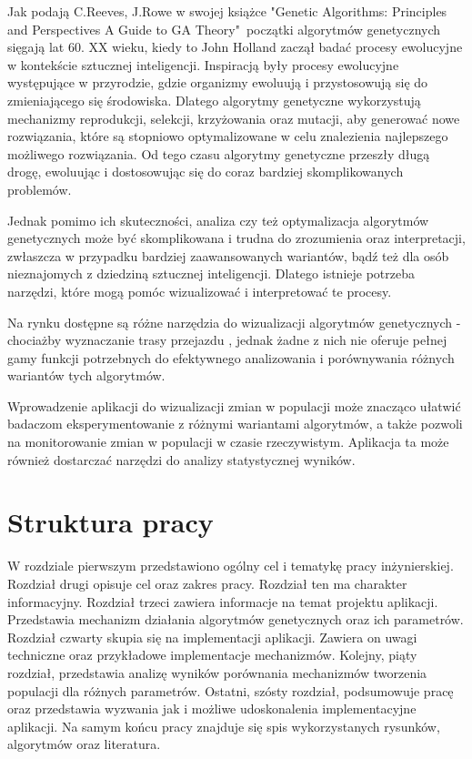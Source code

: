 Jak podają C.Reeves, J.Rowe w swojej książce "Genetic Algorithms: Principles and Perspectives
A Guide to GA Theory"\  początki algorytmów genetycznych sięgają lat 60. XX wieku, kiedy to John Holland zaczął badać procesy ewolucyjne w kontekście sztucznej inteligencji. 
Inspiracją były procesy ewolucyjne występujące w przyrodzie, gdzie organizmy ewoluują i przystosowują się do zmieniającego się środowiska. Dlatego algorytmy genetyczne wykorzystują mechanizmy reprodukcji, selekcji, krzyżowania oraz mutacji, aby generować nowe rozwiązania, które są stopniowo optymalizowane w celu znalezienia najlepszego możliwego rozwiązania.\linebreak
Od tego czasu algorytmy genetyczne przeszły długą drogę, ewoluując i dostosowując się do coraz bardziej skomplikowanych problemów.

Jednak pomimo ich skuteczności, analiza czy też optymalizacja algorytmów genetycznych może być skomplikowana i trudna do zrozumienia oraz interpretacji, zwłaszcza w przypadku bardziej zaawansowanych wariantów, bądź też dla osób nieznajomych z dziedziną sztucznej inteligencji. Dlatego istnieje potrzeba narzędzi, które mogą pomóc wizualizować i interpretować te procesy.

Na rynku dostępne są różne narzędzia do wizualizacji algorytmów genetycznych - chociażby wyznaczanie trasy przejazdu , jednak żadne z nich nie oferuje pełnej gamy funkcji potrzebnych do efektywnego analizowania i porównywania różnych wariantów tych algorytmów.

Wprowadzenie aplikacji do wizualizacji zmian w populacji może znacząco ułatwić badaczom eksperymentowanie z różnymi wariantami algorytmów, a także pozwoli na monitorowanie zmian w populacji w czasie rzeczywistym. Aplikacja ta może również dostarczać narzędzi do analizy statystycznej wyników.\\


\section{Struktura pracy}
W rozdziale pierwszym przedstawiono ogólny cel i tematykę pracy inżynierskiej. Rozdział drugi opisuje cel oraz zakres pracy. Rozdział ten ma charakter informacyjny. Rozdział trzeci zawiera informacje na temat projektu aplikacji. Przedstawia mechanizm działania algorytmów genetycznych oraz ich parametrów. Rozdział czwarty skupia się na implementacji aplikacji. Zawiera on uwagi techniczne oraz przykładowe implementacje mechanizmów. Kolejny, piąty rozdział, przedstawia analizę wyników porównania mechanizmów tworzenia populacji dla różnych parametrów. Ostatni, szósty rozdział, podsumowuje pracę oraz przedstawia wyzwania jak i możliwe udoskonalenia implementacyjne aplikacji. Na samym końcu pracy znajduje się spis wykorzystanych rysunków, algorytmów oraz literatura.

